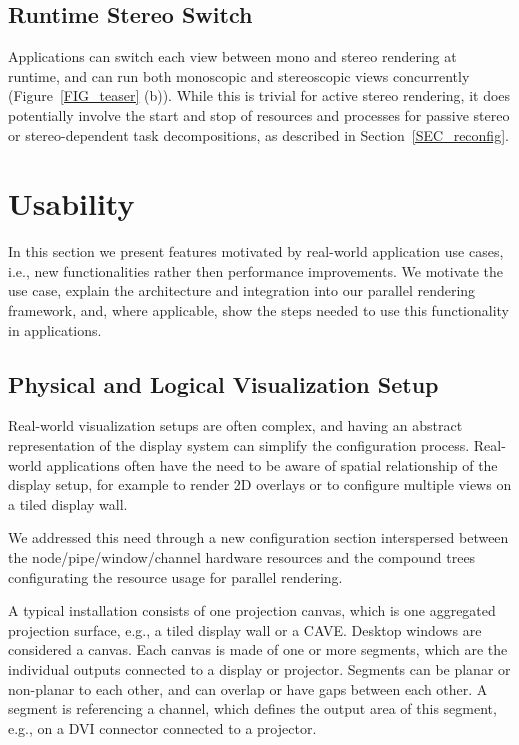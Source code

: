 \documentclass[10pt,journal,compsoc]{IEEEtran}
\newcommand{\sref}[1]{Section~\ref{#1}}
\newcommand{\fig}[1]{Figure~\ref{#1}}
\begin{document}
\subsection{Runtime Stereo Switch}

Applications can switch each view between mono and stereo rendering at runtime,
and can run both monoscopic and stereoscopic views concurrently
(\fig{FIG_teaser} (b)). While this is trivial for active stereo rendering, it
does potentially involve the start and stop of resources and processes for
passive stereo or stereo-dependent task decompositions, as described in
\sref{SEC_reconfig}.

\section{Usability}

In this section we present features motivated by real-world application use
cases, i.e., new functionalities rather then performance improvements. We
motivate the use case, explain the architecture and integration into our
parallel rendering framework, and, where applicable, show the steps needed to
use this functionality in applications.

\subsection{Physical and Logical Visualization Setup}

Real-world visualization setups are often complex, and having an abstract
representation of the display system can simplify the configuration
process. Real-world applications often have the need to be aware of spatial
relationship of the display setup, for example to render 2D overlays or to
configure multiple views on a tiled display wall.

We addressed this need through a new configuration section interspersed between
the node/pipe/window/channel hardware resources and the compound trees
configurating the resource usage for parallel rendering.

A typical installation consists of one projection canvas, which is one
aggregated projection surface, e.g., a tiled display wall or a CAVE. Desktop
windows are considered a canvas. Each canvas is made of one or more segments,
which are the individual outputs connected to a display or projector. Segments
can be planar or non-planar to each other, and can overlap or have gaps between
each other. A segment is referencing a channel, which defines the output area of
this segment, e.g., on a DVI connector connected to a projector.
\end{document}
